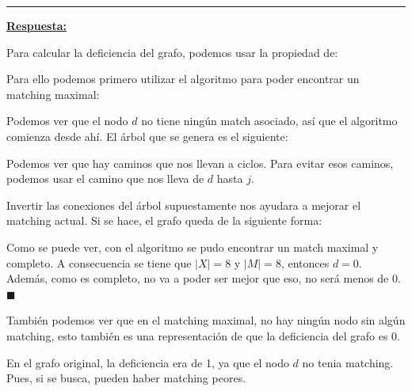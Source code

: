 \documentclass[legalpaper,10pt]{article}
\begin{document}
\begin{enumerate}[1)]
\rule{5cm}{0.4pt}

\underline{\textbf{Respuesta:}}

Para calcular la deficiencia del grafo, podemos usar la propiedad de:

\begin{center}
\end{center}

Para ello podemos primero utilizar el algoritmo para poder encontrar un matching maximal:


Podemos ver que el nodo \(d\) no tiene ningún match asociado, así que el algoritmo comienza desde ahí. El árbol que se genera es el siguiente:


Podemos ver que hay caminos que nos llevan a ciclos. Para evitar esos caminos, podemos usar el camino que nos lleva de \(d\) hasta \(j\).


Invertir las conexiones del árbol supuestamente nos ayudara a mejorar el matching actual. Si se hace, el grafo queda de la siguiente forma:


Como se puede ver, con el algoritmo se pudo encontrar un match maximal y completo. A consecuencia se tiene que \(|X| = 8\) y \(|M| = 8\), entonces \(\boxed{d = 0}\). Además, como es completo, no va a poder ser mejor que eso, no será menos de 0. \hfill \(\blacksquare\)

También podemos ver que en el matching maximal, no hay ningún nodo sin algún matching, esto también es una representación de que la deficiencia del grafo es 0.

En el grafo original, la deficiencia era de 1, ya que el nodo \(d\) no tenia matching. Pues, si se busca, pueden haber matching peores.







\newpage


\end{enumerate}

\end{document}

